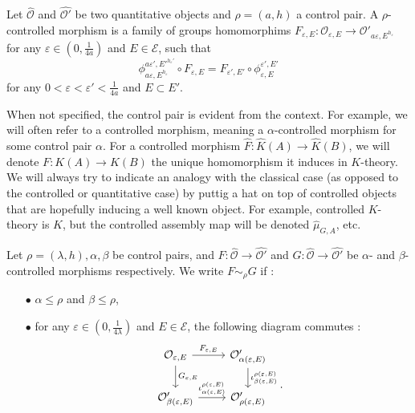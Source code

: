 \begin{definition}
Let $\hat{\mathcal O}$ and $\hat{\mathcal O'}$ be two quantitative objects and $\rho=(a,h)$ a control pair. A $\rho$-controlled morphism is a family of groups homomorphims $F_{\varepsilon, E} : \mathcal O_{\varepsilon, E} \rightarrow \mathcal{ O'}_{a\varepsilon, E^{h_\varepsilon}}$ for any $\varepsilon\in(0,\frac{1}{4a})$ and $E\in\mathcal E$, such that
\[\phi^{a\varepsilon',E'^{h_\varepsilon'}}_{a\varepsilon,E^{h_\varepsilon}} \circ F_{\varepsilon, E} =F_{\varepsilon',E'} \circ \phi_{\varepsilon,E}^{\varepsilon',E'}\] for any $0<\varepsilon<\varepsilon'<\frac{1}{4a}$ and $E\subset E'$.
\end{definition}

\begin{rk}
When not specified, the control pair is evident from the context. For example, we will often refer to a controlled morphism, meaning a $\alpha$-controlled morphism for some control pair $\alpha$. For a controlled morphism $\hat F : \hat K(A)\rightarrow \hat K(B)$, we will denote $F:K(A)\rightarrow K(B)$ the unique homomorphism it induces in $K$-theory. We will always try to indicate an analogy with the classical case (as opposed to the controlled or quantitative case) by puttig a hat on top of controlled objects that are hopefully inducing a well known object. For example, controlled $K$-theory is $\hat K$, but the controlled assembly map will be denoted $\hat \mu_{G,A}$, etc.\\
\end{rk}

Let $\rho=(\lambda,h),\alpha,\beta$ be control pairs, and $F :  \hat{\mathcal O} \rightarrow \hat{\mathcal O'}$ and $G : \hat{\mathcal O} \rightarrow \hat{\mathcal O'}$ be $\alpha$- and $\beta$-controlled morphisms respectively. We write $F\sim_\rho G$ if :
\begin{itemize}%
\item[$\bullet$] $\alpha \leq \rho$ and $\beta \leq \rho$,
\item[$\bullet$] for any $\varepsilon\in (0,\frac{1}{4\lambda})$ and $E\in \mathcal E$, the following diagram commutes : 
\[\begin{tikzcd}
 \mathcal O_{\varepsilon,E} \arrow{r}{F_{\varepsilon,E}} \arrow{d}{G_{\varepsilon,E}} & \mathcal O'_{\alpha (\varepsilon,E) } 
\arrow{d}{\iota_{\beta(\varepsilon,E)}^{\rho(\varepsilon,E)}} \\
 \mathcal O'_{\beta (\varepsilon,E) } \arrow{r}{\iota_{\alpha(\varepsilon,E)}^{\rho(\varepsilon,E)}} & \mathcal O'_{\rho(\varepsilon,E)}\\
\end{tikzcd}.\]
\end{itemize}

